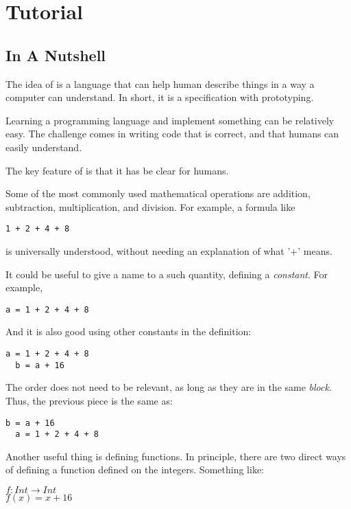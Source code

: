 \chapter{Tutorial}

\section{In A Nutshell}

The idea of \Soda is a language that can help human describe things in a way a computer can understand.
In short, it is a specification with prototyping.

Learning a programming language and implement something can be relatively easy.
The challenge comes in writing code that is correct, and that humans can easily understand.

The key feature of \Soda is that it has be clear for humans.

Some of the most commonly used mathematical operations are addition, subtraction, multiplication, and division.
For example, a formula like
\begin{lstlisting}[label={lst:exampleAddition}]
  1 + 2 + 4 + 8
\end{lstlisting}
is universally understood, without needing an explanation of what '+' means.

It could be useful to give a name to a such quantity, defining a \emph{constant}.
For example,
\begin{lstlisting}[label={lst:exampleBindingToConstant}]
  a = 1 + 2 + 4 + 8
\end{lstlisting}

And it is also good using other constants in the definition:
\begin{lstlisting}[label={lst:exampleBindingToMultipleConstants}]
  a = 1 + 2 + 4 + 8
  b = a + 16
\end{lstlisting}

The order does not need to be relevant, as long as they are in the same \emph{block}.
Thus, the previous piece is the same as:
\begin{lstlisting}[label={lst:exampleBindingToMultipleConstantsDifferentOder}]
  b = a + 16
  a = 1 + 2 + 4 + 8
\end{lstlisting}

Another useful thing is defining functions.
In principle, there are two direct ways of defining a function defined on the integers.
Something like:
\begin{center}
    $f: Int \to Int$ \\
    $f(x) = x + 16$
\end{center}

